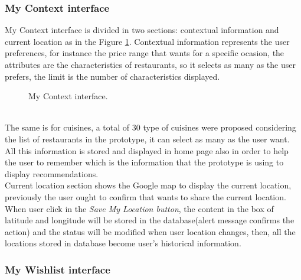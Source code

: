 \subsubsection{My Context interface}

My Context interface is divided in two sections: contextual 
information and current location as in the Figure  \ref{fig:mycontext}.
Contextual information represents the user preferences, for instance
the price range that wants for a specific ocasion, the attributes are
the characteristics of restaurants, so it selects as many as the user
prefers, the limit is the number of characteristics displayed. 
 \begin{figure}
\captionsetup{font=footnotesize}
\centering
{}
\caption{My Context interface.}
\label{fig:mycontext}   
\end{figure}
\\ The same is for cuisines, a total of 30 type of cuisines were
proposed considering the list of restaurants in the prototype, it can
select as many as the user want.  \\All this information is stored and
displayed in home page also in order to help the user to remember
which is the information that the prototype is using to display
recommendations.\\  Current location section shows the Google map to
display the current location, previously the user ought to confirm
that wants to share the current location. \\  When user click in the
\textit{Save My Location button}, the content in the box of latitude
and longitude will be stored in the database(alert message  confirms
the action) and the status will be modified when user location
changes, then, all the locations stored in database become user's
historical information.

\subsubsection{My Wishlist interface}


